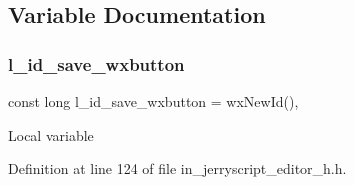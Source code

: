 \subsection{Variable Documentation}
\mbox{\label{group___editor_ga4ef36534ca48c5e12b04fe8847c295f3}} 
\subsubsection{l\_id\_save\_wxbutton}
{\footnotesize\ttfamily const long l\+\_\+id\+\_\+save\+\_\+wxbutton = wx\+New\+Id()\hspace{0.3cm}{\ttfamily [static]}, {\ttfamily [protected]}}

Local variable 

Definition at line 124 of file in\+\_\+jerryscript\+\_\+editor\+\_\+h.\+h.


